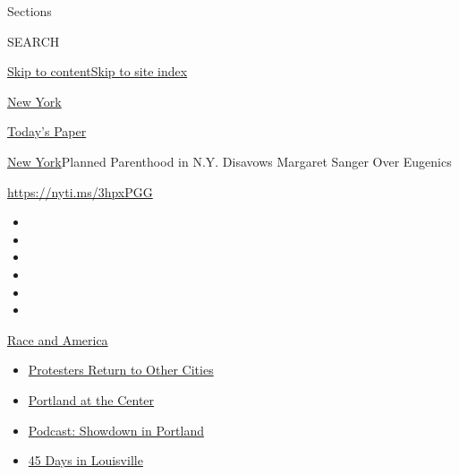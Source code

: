 Sections

SEARCH

\protect\hyperlink{site-content}{Skip to
content}\protect\hyperlink{site-index}{Skip to site index}

\href{https://www.nytimes3xbfgragh.onion/section/nyregion}{New York}

\href{https://myaccount.nytimes3xbfgragh.onion/auth/login?response_type=cookie\&client_id=vi}{}

\href{https://www.nytimes3xbfgragh.onion/section/todayspaper}{Today's
Paper}

\href{/section/nyregion}{New York}\textbar{}Planned Parenthood in N.Y.
Disavows Margaret Sanger Over Eugenics

\url{https://nyti.ms/3hpxPGG}

\begin{itemize}
\item
\item
\item
\item
\item
\item
\end{itemize}

\href{https://www.nytimes3xbfgragh.onion/news-event/george-floyd-protests-minneapolis-new-york-los-angeles?action=click\&pgtype=Article\&state=default\&region=TOP_BANNER\&context=storylines_menu}{Race
and America}

\begin{itemize}
\tightlist
\item
  \href{https://www.nytimes3xbfgragh.onion/2020/07/26/us/protests-portland-seattle-trump.html?action=click\&pgtype=Article\&state=default\&region=TOP_BANNER\&context=storylines_menu}{Protesters
  Return to Other Cities}
\item
  \href{https://www.nytimes3xbfgragh.onion/2020/07/24/us/portland-oregon-protests-white-race.html?action=click\&pgtype=Article\&state=default\&region=TOP_BANNER\&context=storylines_menu}{Portland
  at the Center}
\item
  \href{https://www.nytimes3xbfgragh.onion/2020/07/23/podcasts/the-daily/portland-protests.html?action=click\&pgtype=Article\&state=default\&region=TOP_BANNER\&context=storylines_menu}{Podcast:
  Showdown in Portland}
\item
  \href{https://www.nytimes3xbfgragh.onion/interactive/2020/07/16/us/black-lives-matter-protests-louisville-breonna-taylor.html?action=click\&pgtype=Article\&state=default\&region=TOP_BANNER\&context=storylines_menu}{45
  Days in Louisville}
\end{itemize}

